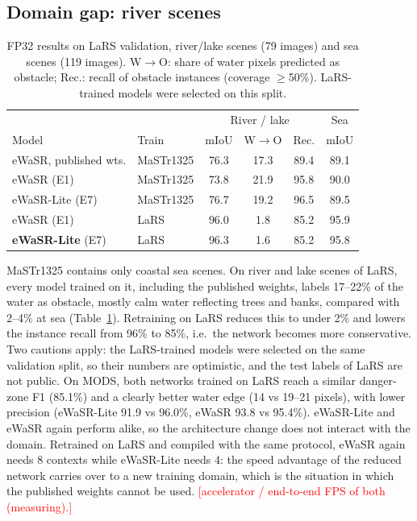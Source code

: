 \documentclass[conference]{IEEEtran}
\newcommand{\tbd}[1]{\textcolor{red}{[#1]}}
\begin{document}
\subsection{Domain gap: river scenes}
\label{sec:lars}
\begin{table}[t]
\centering
\caption{FP32 results on LaRS validation, river/lake scenes (79 images) and sea scenes (119 images). W$\to$O: share of water pixels predicted as obstacle; Rec.: recall of obstacle instances (coverage $\geq$50\%). LaRS-trained models were selected on this split.}
\label{tab:lars}
\setlength{\tabcolsep}{2.2pt}
\begin{tabular}{llcccc}
\toprule
& & \multicolumn{3}{c}{River / lake} & Sea \\
Model & Train & mIoU & W$\to$O & Rec. & mIoU \\
\midrule
eWaSR, published wts. & MaSTr1325 & 76.3 & 17.3 & 89.4 & 89.1 \\
eWaSR (E1)            & MaSTr1325 & 73.8 & 21.9 & 95.8 & 90.0 \\
eWaSR-Lite (E7)       & MaSTr1325 & 76.7 & 19.2 & 96.5 & 89.5 \\
\midrule
eWaSR (E1)            & LaRS      & 96.0 & 1.8 & 85.2 & 95.9 \\
\textbf{eWaSR-Lite} (E7) & LaRS   & 96.3 & 1.6 & 85.2 & 95.8 \\
\bottomrule
\end{tabular}
\end{table}

MaSTr1325 contains only coastal sea scenes. On river and lake scenes of LaRS, every model trained on it, including the published weights, labels 17--22\% of the water as obstacle, mostly calm water reflecting trees and banks, compared with 2--4\% at sea (Table~\ref{tab:lars}). Retraining on LaRS reduces this to under 2\% and lowers the instance recall from 96\% to 85\%, i.e.\ the network becomes more conservative. Two cautions apply: the LaRS-trained models were selected on the same validation split, so their numbers are optimistic, and the test labels of LaRS are not public. On MODS, both networks trained on LaRS reach a similar danger-zone F1 (85.1\%) and a clearly better water edge (14 vs 19--21 pixels), with lower precision (eWaSR-Lite 91.9 vs 96.0\%, eWaSR 93.8 vs 95.4\%). eWaSR-Lite and eWaSR again perform alike, so the architecture change does not interact with the domain. Retrained on LaRS and compiled with the same protocol, eWaSR again needs 8 contexts while eWaSR-Lite needs 4: the speed advantage of the reduced network carries over to a new training domain, which is the situation in which the published weights cannot be used. \tbd{accelerator / end-to-end FPS of both (measuring).}
\end{document}
